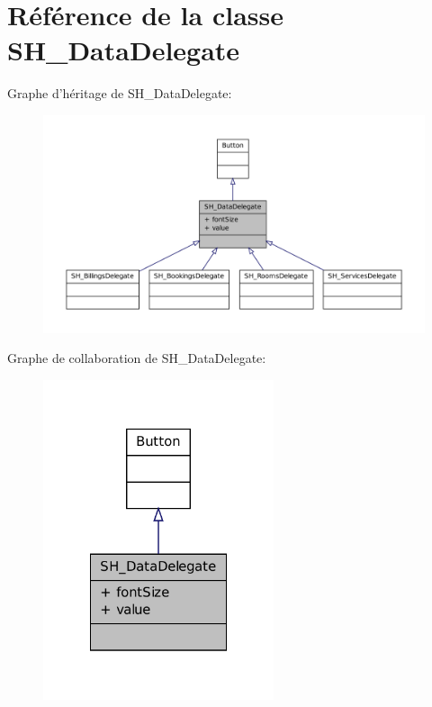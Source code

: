 \hypertarget{classSH__DataDelegate}{\section{Référence de la classe S\-H\-\_\-\-Data\-Delegate}
\label{classSH__DataDelegate}
}


Graphe d'héritage de S\-H\-\_\-\-Data\-Delegate\-:
\nopagebreak
\begin{figure}[H]
\begin{center}
\leavevmode
\includegraphics[width=350pt]{classSH__DataDelegate__inherit__graph}
\end{center}
\end{figure}


Graphe de collaboration de S\-H\-\_\-\-Data\-Delegate\-:
\nopagebreak
\begin{figure}[H]
\begin{center}
\leavevmode
\includegraphics[width=192pt]{classSH__DataDelegate__coll__graph}
\end{center}
\end{figure}
